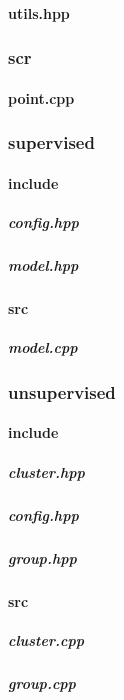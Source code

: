 \documentclass[12pt]{article}
\newcommand{\incDemo}[2]{\label{demo:#2}\newpage}
\begin{document}
\paragraph{utils.hpp}														\incDemo{c++}{include/utils.hpp}
\subsubsection{scr}														%
\paragraph{point.cpp}													\incDemo{c++}{scr/point.cpp}
\subsubsection{supervised}											%
\paragraph{include}														%
\subparagraph{config.hpp}											\incDemo{c++}{supervised/include/config.hpp}
\subparagraph{model.hpp}											\incDemo{c++}{supervised/include/model.hpp}
\paragraph{src}																%
\subparagraph{model.cpp}												\incDemo{c++}{supervised/src/model.cpp}
\subsubsection{unsupervised}										%
\paragraph{include}														%
\subparagraph{cluster.hpp}											\incDemo{c++}{unsupervised/include/cluster.hpp}
\subparagraph{config.hpp}											\incDemo{c++}{unsupervised/include/config.hpp}
\subparagraph{group.hpp}												\incDemo{c++}{unsupervised/include/group.hpp}
\paragraph{src}																%
\subparagraph{cluster.cpp}											\incDemo{c++}{unsupervised/src/cluster.cpp}
\subparagraph{group.cpp}												\incDemo{c++}{unsupervised/src/group.cpp}
\end{document}
